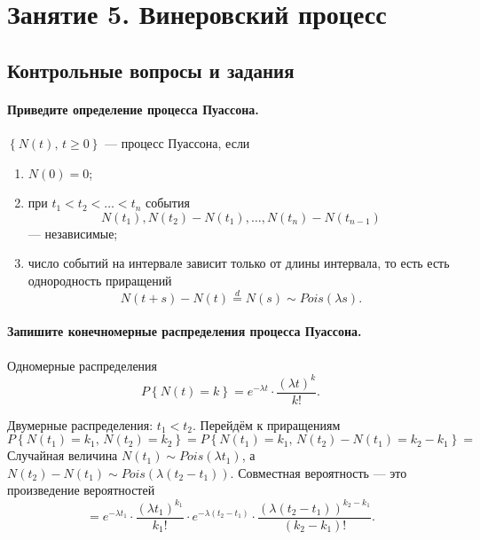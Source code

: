 \chapter*{Занятие 5. Винеровский процесс}

\section*{Контрольные вопросы и задания}

\subsubsection*{Приведите определение процесса Пуассона.}

$\left\{ N \left( t \right), \, t \geq 0 \right\} $ --- процесс Пуассона, если
\begin{enumerate}
  \item $N \left( 0 \right) = 0$;
  \item при $t_1 < t_2 < \dotsc < t_n$ события
  $$N \left( t_1 \right), N \left( t_2 \right) - N \left( t_1 \right), \dotsc,
    N \left( t_n \right) - N \left( t_{n - 1} \right) $$
  --- независимые;
  \item число событий на интервале зависит только от длины интервала,
  то есть есть однородность приращений
  $$N \left( t + s \right) - N \left( t \right) \overset{d}{=}
    N \left( s \right) \sim
    Pois \left( \lambda s \right).$$
\end{enumerate}

\subsubsection*{Запишите конечномерные распределения процесса Пуассона.}

Одномерные распределения
$$P \left\{ N \left( t \right) = k \right\} =
  e^{-\lambda t} \cdot \frac{ \left( \lambda t \right)^k}{k!}.$$

Двумерные распределения: $t_1 < t_2$.
Перейдём к приращениям
$$P \left\{ N \left( t_1 \right) = k_1, \, N \left( t_2 \right) = k_2 \right\} =
  P \left\{
    N \left( t_1 \right) = k_1, \, N \left( t_2 \right) - N \left( t_1 \right) = k_2 - k_1
  \right\} =$$
Случайная величина $N \left( t_1 \right) \sim Pois \left( \lambda t_1 \right) $, а
$N \left( t_2 \right) - N \left( t_1 \right) \sim
  Pois \left( \lambda \left( t_2 - t_1 \right) \right) $.
Совместная вероятность --- это произведение вероятностей
$$= e^{-\lambda t_1} \cdot \frac{ \left( \lambda t_1 \right)^{k_1}}{k_1!} \cdot
  e^{-\lambda \left( t_2 - t_1 \right) } \cdot
  \frac{ \left( \lambda \left( t_2 - t_1 \right) \right)^{k_2 - k_1}}{ \left( k_2 - k_1 \right)!}.$$

